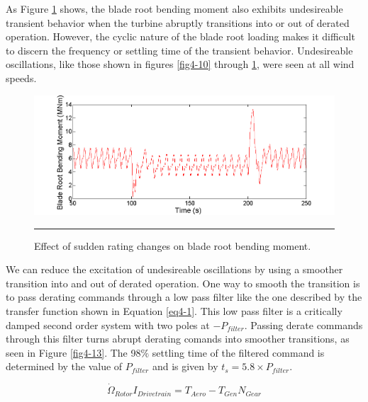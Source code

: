 As Figure \ref{fig4-12} shows, the blade root bending moment also exhibits undesireable transient behavior when the turbine abruptly transitions into or out of derated operation. However, the cyclic nature of the blade root loading makes it difficult to discern the frequency or settling time of the transient behavior. Undesireable oscillations, like those shown in figures \ref{fig4-10} through \ref{fig4-12}, were seen at all wind speeds.

\begin{figure}[htbp]
	\centering
		\includegraphics[trim = {1cm 0 2cm 0}, clip, width = \linewidth]{Figures/ch4Figures/fig4-12.png}
		\rule{35em}{0.5pt}
	\caption{Effect of sudden rating changes on blade root bending moment.}
	\label{fig4-12}
\end{figure}

We can reduce the excitation of undesireable oscillations by using a smoother transition into and out of derated operation. One way to smooth the transition is to pass derating commands through a low pass filter like the one described by the transfer function shown in Equation \ref{eq4-1}. This low pass filter is a critically damped second order system with two poles at $-P_{filter}$. Passing derate commands through this filter turns abrupt derating comands into smoother transitions, as seen in Figure \ref{fig4-13}. The 98$\%$ settling time of the filtered command is determined by the value of $P_{filter}$ and is given by $t_s = 5.8\times P_{filter}$.

\begin{equation}
	\dot{\Omega }_{Rotor}I_{Drivetrain}=T_{Aero}-T_{Gen}N_{Gear} \label{eq4-1}
\end{equation}


